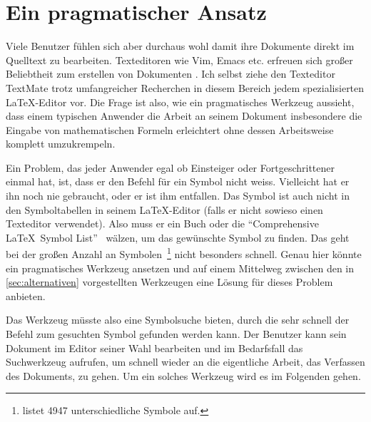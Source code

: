 \section{Ein pragmatischer Ansatz} %
\label{sec:pragmatisch}

Viele Benutzer fühlen sich aber durchaus wohl damit ihre Dokumente direkt im Quelltext zu bearbeiten. Texteditoren wie Vim, Emacs etc. erfreuen sich großer Beliebtheit zum erstellen von Dokumenten \cite{latex-editor-windows, latex-editor-linux}. Ich selbst ziehe den Texteditor TextMate trotz umfangreicher Recherchen in diesem Bereich jedem spezialisierten \LaTeX-Editor vor. Die Frage ist also, wie ein pragmatisches Werkzeug aussieht, dass einem typischen Anwender die Arbeit an seinem Dokument insbesondere die Eingabe von mathematischen Formeln erleichtert ohne dessen Arbeitsweise komplett umzukrempeln.

Ein Problem, das jeder Anwender egal ob Einsteiger oder Fortgeschrittener einmal hat, ist, dass er den Befehl für ein Symbol nicht weiss. Vielleicht hat er ihn noch nie gebraucht, oder er ist ihm entfallen. Das Symbol ist auch nicht in den Symboltabellen in seinem \LaTeX-Editor (falls er nicht sowieso einen Texteditor verwendet). Also muss er ein Buch oder die "`Comprehensive \LaTeX\ Symbol List"'~\cite{Pakin:2009p2664} wälzen, um das gewünschte Symbol zu finden. Das geht bei der großen Anzahl an Symbolen~\footnote{\cite{Pakin:2009p2664} listet 4947 unterschiedliche Symbole auf.} nicht besonders schnell. Genau hier könnte ein pragmatisches Werkzeug ansetzen und auf einem Mittelweg zwischen den in \ref{sec:alternativen} vorgestellten Werkzeugen eine Lösung für dieses Problem anbieten.

Das Werkzeug müsste also eine Symbolsuche bieten, durch die sehr schnell der Befehl zum gesuchten Symbol gefunden werden kann. Der Benutzer kann sein Dokument im Editor seiner Wahl bearbeiten und im Bedarfsfall das Suchwerkzeug aufrufen, um schnell wieder an die eigentliche Arbeit, das Verfassen des Dokuments, zu gehen. Um ein solches Werkzeug wird es im Folgenden gehen.

% 
% 
